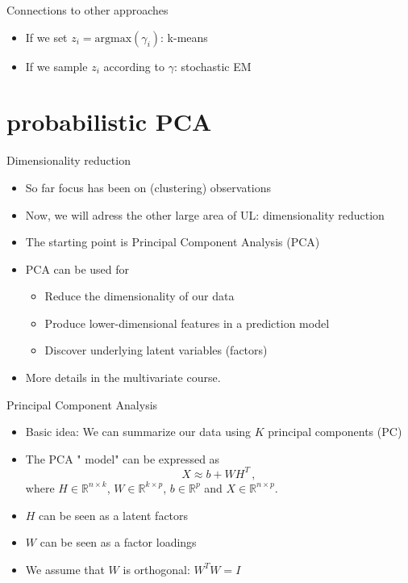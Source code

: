 \documentclass[10pt]{beamer}
\begin{document}
\begin{frame}{Connections to other approaches}

\begin{itemize}
\item If we set $z_i = \text{argmax}(\gamma_i)$: {\color{uured} k-means}\pause
\item If we sample $z_i$ according to $\gamma$: {\color{uured} stochastic EM}
\end{itemize}

\end{frame}

\section{probabilistic PCA}

\begin{frame}{Dimensionality reduction}

\begin{itemize}
\item So far focus has been on (clustering) {\color{uured} observations}
\item Now, we will adress the other large area of UL: {\color{uured} dimensionality reduction}\pause
\item The starting point is {\color{uured} Principal Component Analysis} (PCA)
\item PCA can be used for
\begin{itemize}
\item {\color{uured} Reduce the dimensionality} of our data
\item {\color{uured} Produce lower-dimensional features} in a prediction model
\item {\color{uured} Discover underlying latent variables} (factors)
\end{itemize}
\pause
\item More details in the multivariate course.
\end{itemize}

\end{frame}

\begin{frame}{Principal Component Analysis}

\begin{itemize}
\item {\color{uured} Basic idea}: We can summarize our data using $K$ principal components (PC)
\item The PCA "{\color{uured} model}" can be expressed as
\[
X \approx b +  W H^T\,,
\]
where $H \in \mathbb{R}^{n \times k}$, $W \in \mathbb{R}^{k \times p}$, $b \in \mathbb{R}^{p}$ and $X \in \mathbb{R}^{n \times p}$.
\item $H$ can be seen as a {\color{uured} latent factors}
\item $W$ can be seen as a {\color{uured} factor loadings}
\item We assume that $W$ is orthogonal: $W^T W = I$
\end{itemize}

\end{frame}
\end{document}
